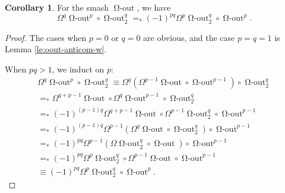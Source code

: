 \documentclass{amsart}
\theoremstyle{definition}
\newtheorem{cor}[theorem]{Corollary}
\newcommand{\oout}{\operatorname{\Omega-out}}
\newcommand{\ooutk}[1]{\operatorname{\Omega-out}^{#1}}
\begin{document}
\begin{cor}\label{cor:oout-anticom-w}
    For the smash $\oout$, we have
    $$\Omega^q \ooutk{p} \circ \ooutk{q}_2 =_* (-1)^{pq}\Omega^p \ooutk{q}_2 \circ \ooutk{p}.$$
\end{cor}
\begin{proof}
    The cases when $p=0$ or $q=0$ are obvious, and the case $p=q= 1$ is Lemma \ref{le:oout-anticom-w}.

    When $pq >1$, we induct on $p$:
    \begin{align*}
        \Omega^q \ooutk{p} \circ \ooutk{q}_2 \equiv \Omega^q (\Omega^{p-1}\oout \circ \ooutk{p-1}) \circ \ooutk{q}_2
        \\ =_* \Omega^{q+p-1}\oout \circ \Omega^q \ooutk{p-1} \circ \ooutk{q}_2
        \\ =_* (-1)^{(p-1)q}\Omega^{q+p-1}\oout \circ \Omega^{p-1} \ooutk{q}_2 \circ \ooutk{p-1}
        \\ =_* (-1)^{(p-1)q}\Omega^{p-1} (\Omega^q \oout \circ \ooutk{q}_2) \circ \ooutk{p-1}
        \\ =_* (-1)^{pq}\Omega^{p-1} (\Omega \ooutk{q}_2 \circ \oout) \circ \ooutk{p-1}
        \\ =_* (-1)^{pq}\Omega^{p} \ooutk{q}_2 \circ \Omega^{p-1} \oout \circ \ooutk{p-1}
        \\ \equiv (-1)^{pq}\Omega^{p} \ooutk{q}_2 \circ \ooutk{p}.
    \end{align*}
\end{proof}
\end{document}
